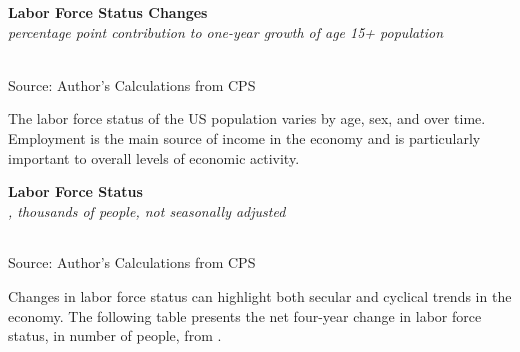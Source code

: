 \documentclass{report}
\makeatletter
\newcommand{\tbllink}[1]{\href{https://raw.githubusercontent.com/bdecon/US-chartbook/master/chartbook/data/#1}{\faTable}}
\newcommand*\short[1]{\expandafter\@gobbletwo\number\numexpr#1\relax}
\newcommand{\ctsbar}[5]{
		\addplot[ybar stacked, bar width=#5, draw opacity=0, fill=#1] 
			table [x=#2, y=#3, col sep=comma]{#4};}
\newcommand{\dateaxisticks}{
		date coordinates in=x, axis line style={draw=none},
		xmax={2023-10-01},
		max space between ticks=40,	    
		xtick={{1990-01-01}, {1992-01-01}, {1994-01-01}, 
			{1996-01-01}, {1998-01-01}, {2000-01-01}, 
			{2002-01-01}, {2004-01-01}, {2006-01-01},
			{2008-01-01}, {2010-01-01}, {2012-01-01}, {2014-01-01},
		    {2016-01-01}, {2018-01-01}, {2020-01-01}, {2022-01-01}, 
		    {2024-01-01}, {2026-01-01}},
		minor xtick={{1989-01-01}, {1991-01-01}, {1993-01-01},
			{1995-01-01}, {1997-01-01}, {1999-01-01}, 
			{2001-01-01}, {2003-01-01}, {2005-01-01}, {2007-01-01},
		    {2009-01-01}, {2011-01-01}, {2013-01-01}, {2015-01-01},
		    {2017-01-01}, {2019-01-01}, {2021-01-01}, {2023-01-01}, 
		    {2025-01-01}, {2027-01-01}},
		enlarge y limits={0.06}, enlarge x limits={0.01},
		}
\newcommand{\bbar}[2]{extra #1 ticks = {{#2}}, extra #1 tick labels = ,
		extra #1 tick style = {grid=major, grid style={thick, black!25}},}
\newcommand{\rbars}{
		\fill[color=black!10] (axis cs:{1990-07-01},\pgfkeysvalueof{/pgfplots/ymin}) rectangle 
			(axis cs:{1991-03-01}, \pgfkeysvalueof{/pgfplots/ymax});
		\fill[color=black!10] (axis cs:{2007-12-01},\pgfkeysvalueof{/pgfplots/ymin}) rectangle 
			(axis cs:{2009-07-01}, \pgfkeysvalueof{/pgfplots/ymax});
		\fill[color=black!10] (axis cs:{2001-03-01},\pgfkeysvalueof{/pgfplots/ymin}) rectangle 
			(axis cs:{2001-11-01}, \pgfkeysvalueof{/pgfplots/ymax});
		\fill[color=black!10] (axis cs:{2020-02-01},\pgfkeysvalueof{/pgfplots/ymin}) rectangle 
			(axis cs:{2020-05-01}, \pgfkeysvalueof{/pgfplots/ymax});}
\makeatother
\begin{document}
{\begin{minipage}{0.76\textwidth}
\normalsize \textbf{Labor Force Status Changes}\\
\footnotesize{\textit{percentage point contribution to one-year growth of age 15+ population}}\\
\hspace*{-2mm} \\
\footnotesize{Source: Author's Calculations from CPS} \hfill \tbllink{cps_lfs2.csv}
\end{minipage}
\newpage
\begin{minipage}{0.76\textwidth} 
\small The labor force status of the US population varies by age, sex, and over time. Employment is the main source of income in the economy and is particularly important to overall levels of economic activity. 
\vspace{1mm}

\normalsize \textbf{Labor Force Status}\\
\footnotesize{\textit{\unskip, thousands of people, not seasonally adjusted}}\\
\noindent {} \setlength{\tabcolsep}{3.0pt} \color{black!90}
		{\renewcommand{\arraystretch}{1.5}
		 \begin{tabular}{p{27.8mm} R{11.2mm} R{10.4mm} R{10.4mm} R{10.2mm} 
		 				 R{10.6mm} R{10.4mm} R{10.4mm}}
			  \hline
		\end{tabular}}
\vspace{-3mm}	
	
\footnotesize{Source: Author's Calculations from CPS}
\vspace{4mm}

\small Changes in labor force status can highlight both secular and cyclical trends in the economy. The following table presents the net four-year change in labor force status, in number of people, from \unskip.
\vspace{1mm}


\end{minipage}}
\end{document}

